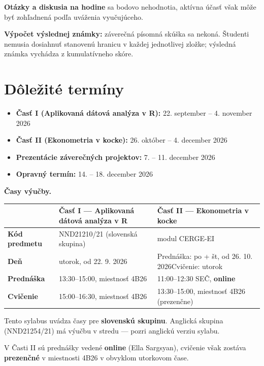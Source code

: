 \documentclass[11pt]{article}
\begin{document}
\noindent\textbf{Otázky a diskusia na hodine} sa bodovo nehodnotia, aktívna účasť však môže byť zohľadnená
podľa uváženia vyučujúceho.

\smallskip
\noindent\textbf{Výpočet výslednej známky:} záverečná písomná skúška sa nekoná. Študenti nemusia dosiahnuť
stanovenú hranicu v každej jednotlivej zložke; výsledná známka vychádza z kumulatívneho skóre.

\section{Dôležité termíny}

\begin{itemize}
  \item \textbf{Časť I (Aplikovaná dátová analýza v R):} 22. september -- 4. november 2026
  \item \textbf{Časť II (Ekonometria v kocke):} 26. október -- 4. december 2026
  \item \textbf{Prezentácie záverečných projektov:} 7. -- 11. december 2026
  \item \textbf{Opravný termín:} 14. -- 18. december 2026
\end{itemize}

\noindent\textbf{Časy výučby.}

\smallskip
\noindent\begin{tabular}{@{}>{\bfseries}p{2.4cm}p{6.4cm}p{6.4cm}@{}}
\toprule
 & \textbf{Časť I} --- Aplikovaná dátová analýza v R & \textbf{Časť II} --- Ekonometria v kocke \\
\midrule
Kód predmetu & NND21210/21 (slovenská skupina) & modul CERGE-EI \\
Deň & utorok, od 22. 9. 2026 & Prednáška: po + št, od 26. 10. 2026\newline Cvičenie: utorok \\
Prednáška & 13:30--15:00, miestnosť 4B26 & 11:00--12:30 SEČ, \textbf{online} \\
Cvičenie & 15:00--16:30, miestnosť 4B26 & 13:30--15:00, miestnosť 4B26 (prezenčne) \\
\bottomrule
\end{tabular}

\smallskip
\noindent Tento sylabus uvádza časy pre \textbf{slovenskú skupinu}. Anglická skupina
(NND21254/21) má výučbu v stredu --- pozri anglickú verziu sylabu.

\smallskip
\noindent V Časti II sú prednášky vedené \textbf{online} (Ella Sargsyan), cvičenie však
zostáva \textbf{prezenčné} v miestnosti 4B26 v obvyklom utorkovom čase.
\end{document}
